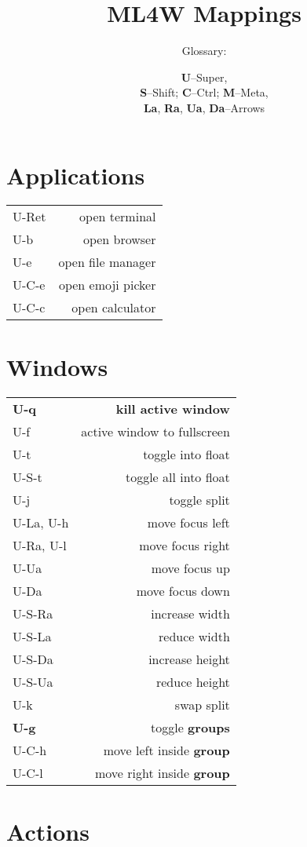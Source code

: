 \documentclass[
  ,landscape
  ,columns=4
]{cheatsheet}
\title{ML4W Mappings}
\author{Glossary:}
\date{
  \textbf{U}--Super,\\
  \textbf{S}--Shift; \textbf{C}--Ctrl; \textbf{M}--Meta,\\
  \textbf{La}, \textbf{Ra}, \textbf{Ua}, \textbf{Da}--Arrows
}
\begin{document}
\maketitle

\section{Applications}

\begin{tabular}{lr}
  U-Ret & open terminal \\
  U-b & open browser \\
  U-e & open file manager \\
  U-C-e & open emoji picker \\
  U-C-c & open calculator \\
\end{tabular}

\section{Windows}

\begin{tabular}{lr}
  \textbf{U-q} & \textbf{kill active window} \\
  U-f & active window to fullscreen \\
  U-t & toggle into float \\
  U-S-t & toggle all into float \\
  U-j & toggle split \\
  U-La, U-h & move focus left \\
  U-Ra, U-l & move focus right \\
  U-Ua & move focus up \\
  U-Da & move focus down \\
  U-S-Ra & increase width \\
  U-S-La & reduce width \\
  U-S-Da & increase height \\
  U-S-Ua & reduce height \\
  U-k & swap split \\
  \textbf{U-g} & toggle \textbf{groups} \\
  U-C-h & move left inside \textbf{group} \\
  U-C-l & move right inside \textbf{group} \\
\end{tabular}

\section{Actions}
\end{document}

